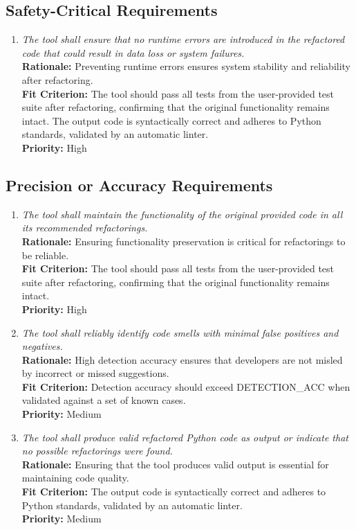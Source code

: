 \documentclass[12pt]{article}
\begin{document}
\subsection{Safety-Critical Requirements}
\begin{enumerate}[label=PR-SCR \arabic*., wide=0pt, leftmargin=*]
  \item \emph{The tool shall ensure that no runtime errors are
      introduced in the refactored code that could result in data loss
    or system failures.}\\[2mm]
    {\bf Rationale:} Preventing runtime errors ensures system
    stability and reliability after refactoring.\\
    {\bf Fit Criterion:} The tool should pass all tests from the
    user-provided test suite after refactoring, confirming that the
    original functionality remains intact. The output code is
    syntactically correct and adheres to Python standards, validated
    by an automatic linter.\\
    {\bf Priority:} High
\end{enumerate}
\subsection{Precision or Accuracy Requirements}
\begin{enumerate}[label=PR-PAR \arabic*., wide=0pt, leftmargin=*]
  \item \emph{The tool shall maintain the functionality of the
    original provided code in all its recommended refactorings.}\\[2mm]
    {\bf Rationale:} Ensuring functionality preservation is critical
    for refactorings to be reliable.\\
    {\bf Fit Criterion:} The tool should pass all tests from the
    user-provided test suite after refactoring, confirming that the
    original functionality remains intact.\\
    {\bf Priority:} High
  \item \emph{The tool shall reliably identify code smells with
    minimal false positives and negatives.}\\[2mm]
    {\bf Rationale:} High detection accuracy ensures that developers
    are not misled by incorrect or missed suggestions.\\
    {\bf Fit Criterion:} Detection accuracy should exceed
    DETECTION\_ACC when validated against a set of known cases.\\
    {\bf Priority:} Medium
  \item \emph{The tool shall produce valid refactored Python code as
    output or indicate that no possible refactorings were found.}\\[2mm]
    {\bf Rationale:} Ensuring that the tool produces valid output is
    essential for maintaining code quality.\\
    {\bf Fit Criterion:} The output code is syntactically correct and
    adheres to Python standards, validated by an automatic linter.\\
    {\bf Priority:} Medium
\end{enumerate}
\end{document}
